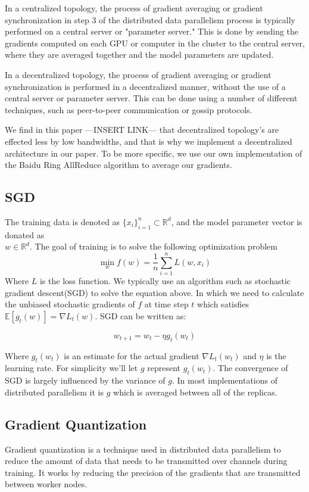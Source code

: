 \documentclass[11pt]{article}
\begin{document}
In a centralized topology, the process of gradient averaging or gradient synchronization in step 3 of the distributed data parallelism process is typically performed on a central server or "parameter server." This is done by sending the gradients computed on each GPU or computer in the cluster to the central server, where they are averaged together and the model parameters are updated.

In a decentralized topology, the process of gradient averaging or gradient synchronization is performed in a decentralized manner, without the use of a central server or parameter server. This can be done using a number of different techniques, such as peer-to-peer communication or gossip protocols.

We find in this paper ---INSERT LINK--- that decentralized topology's are effected less by low bandwidths, and that is why we implement a decentralized architecture in our paper. To be more specific, we use our own implementation of the Baidu Ring AllReduce algorithm to average our gradients.

\subsection{SGD}

The training data is denoted as $\{x_i\}^n_{i=1} \subset \mathbb{R}^d$, and the model parameter vector is donated as\\ $w \in \mathbb{R}^d$. The goal of training is to solve the following optimization problem 
$$
\min_w f
(w) = \frac{1}{n} \sum^n_{i=1}L(w,x_i)
$$
Where $L$ is the loss function. We typically use an algorithm such as stochastic gradient descent(SGD) to solve the equation above. In which we need to calculate the unbiased stochastic gradients of $f$ at time step $t$ which satisfies $\mathbb{E}[g_t(w)] = {\nabla} L_t(w)$. SGD can be written as:

$$
w_{t+1} = w_t - \eta g_t(w_t)
$$

Where $g_t(w_t)$ is an estimate for the actual gradient ${\nabla} L_t(w_t)$ and $\eta$ is the learning rate. For simplicity we'll let $g$ represent $g_t(w_t)$. The convergence of SGD is largely influenced by the variance of $g$. In most implementations of distributed parallelism it is $g$ which is averaged between all of the replicas.


\subsection{Gradient Quantization}
Gradient quantization is a technique used in distributed data parallelism to reduce the amount of data that needs to be transmitted over channels during training. It works by reducing the precision of the gradients that are transmitted between worker nodes.
\end{document}
